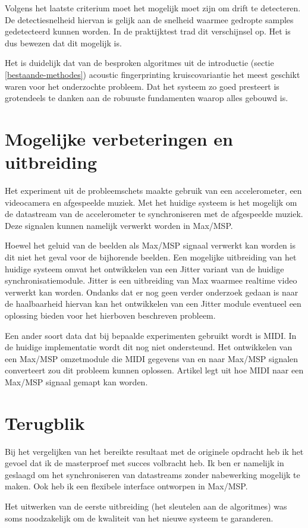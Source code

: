 Volgens het laatste criterium moet het mogelijk moet zijn om drift te detecteren. De detectiesnelheid hiervan is gelijk aan de snelheid waarmee gedropte samples gedetecteerd kunnen worden. In de praktijktest trad dit verschijnsel op. Het is dus bewezen dat dit mogelijk is.

Het is duidelijk dat van de besproken algoritmes uit de introductie (sectie \ref{bestaande-methodes}) acoustic fingerprinting kruiscovariantie het meest geschikt waren voor het onderzochte probleem. Dat het systeem zo goed presteert is grotendeels te danken aan de robuuste fundamenten waarop alles gebouwd is.

\section{Mogelijke verbeteringen en uitbreiding}

Het experiment uit de probleemschets maakte gebruik van een accelerometer, een videocamera en afgespeelde muziek. Met het huidige systeem is het mogelijk om de datastream van de accelerometer te synchroniseren met de afgespeelde muziek. Deze signalen kunnen namelijk verwerkt worden in Max/MSP. 

Hoewel het geluid van de beelden als Max/MSP signaal verwerkt kan worden is dit niet het geval voor de bijhorende beelden. Een mogelijke uitbreiding van het huidige systeem omvat het ontwikkelen van een Jitter variant van de huidige synchronisatiemodule. Jitter is een uitbreiding van Max waarmee realtime video verwerkt kan worden. Ondanks dat er nog geen verder onderzoek gedaan is naar de haalbaarheid hiervan kan het ontwikkelen van een Jitter module eventueel een oplossing bieden voor het hierboven beschreven probleem.

Een ander soort data dat bij bepaalde experimenten gebruikt wordt is MIDI. In de huidige implementatie wordt dit nog niet ondersteund. Het ontwikkelen van een Max/MSP omzetmodule die MIDI gegevens van en naar Max/MSP signalen converteert zou dit probleem kunnen oplossen. Artikel \cite{mspmidi} legt uit hoe MIDI naar een Max/MSP signaal gemapt kan worden.

\section{Terugblik}

Bij het vergelijken van het bereikte resultaat met de originele opdracht heb ik het gevoel dat ik de masterproef met succes volbracht heb. Ik ben er namelijk in geslaagd om het synchroniseren van datastreams zonder nabewerking mogelijk te maken. Ook heb ik een flexibele interface ontworpen in Max/MSP.

Het uitwerken van de eerste uitbreiding (het sleutelen aan de algoritmes) was soms noodzakelijk om de kwaliteit van het nieuwe systeem te garanderen.